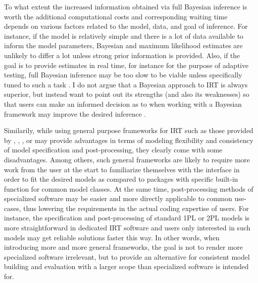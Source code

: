 \documentclass[
]{jss}
\begin{document}
To what extent the increased information obtained via full Bayesian
inference is worth the additional computational costs and corresponding
waiting time depends on various factors related to the model, data, and
goal of inference. For instance, if the model is relatively simple and
there is a lot of data available to inform the model parameters,
Bayesian and maximum likelihood estimates are unlikely to differ a lot
unless strong prior information is provided. Also, if the goal is to
provide estimates in real time, for instance for the purpose of adaptive
testing, full Bayesian inference may be too slow to be viable unless
specifically tuned to such a task \citep[e.g., see][]{vanderlinen2015}.
I do not argue that a Bayesian approach to IRT is always superior, but
instead want to point out its strengths (and also its weaknesses) so
that users can make an informed decision as to when working with a
Bayesian framework may improve the desired inference \citep[see also][
for an example in the context of IRT]{buerkner2020spm}.

Similarily, while using general purpose frameworks for IRT such as those
provided by , , , or  may
provide advantages in terms of modeling flexibility and consistency of
model specification and post-processing, they clearly come with some
disadvantages. Among others, such general frameworks are likely to
require more work from the user at the start to familiarize themselves
with the interface in order to fit the desired models as compared to
packages with specific built-in function for common model classes. At
the same time, post-processing methods of specialized software may be
easier and more directly applicable to common use-cases, thus lowering
the requirements in the actual coding expertise of users. For instance,
the specification and post-processing of standard 1PL or 2PL models is
more straightforward in dedicated IRT software and users only interested
in such models may get reliable solutions faster this way. In other
words, when introducing more and more general frameworks, the goal is
not to render more specialized software irrelevant, but to provide an
alternative for consistent model building and evaluation with a larger
scope than specialized software is intended for.
\end{document}
